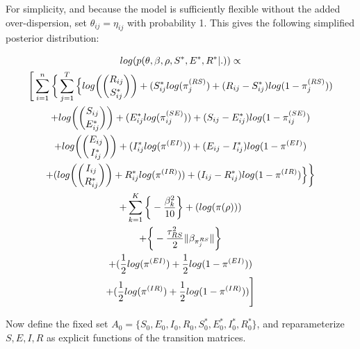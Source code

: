 \documentclass[12pt]{article}
\begin{document}
For simplicity, and because the model is sufficiently flexible without the added over-dispersion, set $\theta_{ij} = \eta_{ij}$ with probability 1. This 
gives the following simplified posterior distribution:

\begin{center}
\begin{multline}
\displaystyle
log(p(\theta,\beta,\rho,S^*,E^*,R^*|.)) \propto \\
\Bigg[ \sum_{i=1}^n \bigg\{ \sum_{j=1}^T
        \Big\{
            log\bigg(\dbinom{R_{ij}}{S^*_{ij}}\bigg) + (S^*_{ij}log(\pi_j^{(RS)}) + (R_{ij} - S^*_{ij})log(1-\pi_j^{(RS)})) \\
            + log\bigg(\dbinom{S_{ij}}{E^*_{ij}}\bigg) + (E^*_{ij}log(\pi_{ij}^{(SE)})) + (S_{ij} - E^*_{ij})log(1-\pi_{ij}^{(SE)}) \\
            + log\bigg(\dbinom{E_{ij}}{I^*_{ij}}\bigg) + (I^*_{ij}log(\pi^{(EI)})) + (E_{ij} - I^*_{ij})log(1-\pi^{(EI)}) \\
            + (log\bigg(\dbinom{I_{ij}}{R^*_{ij}}\bigg) + R^*_{ij}log(\pi^{(IR)})) + (I_{ij} - R^*_{ij})log(1-\pi^{(IR)}) \Big\}\bigg\} \\
    + \sum_{k = 1}^K\bigg\{-\frac{\beta^2_k}{10}\bigg\}
            + (log(\pi(\rho)))\\
            +  \bigg\{ -\frac{\tau^2_{RS}}{2}\|\beta_{\pi_j^{RS}}\|  \bigg\} \\ 
            + (\frac{1}{2}log(\pi^{(EI)}) + \frac{1}{2}log(1-\pi^{(EI)})) \\
            + (\frac{1}{2}log(\pi^{(IR)}) + \frac{1}{2}log(1-\pi^{(IR)}))\Bigg]\\
\end{multline}
\end{center}

Now define the fixed set $A_0 = \{S_0, E_0, I_0, R_0, S^*_0, E^*_0, I^*_0, R^*_0\}$,
and reparameterize $S, E, I, R$ as explicit functions of the transition matrices. 
\end{document}
